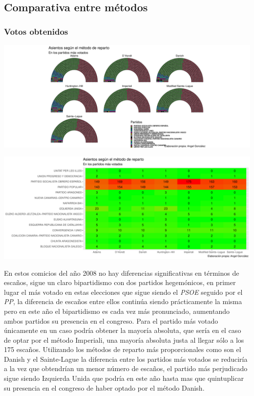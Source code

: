 \documentclass[12pt,a4paper,]{book}
\numberwithin{dummy}{section}
\theoremstyle{ocrenumbox}
\theoremstyle{blacknumex}
\theoremstyle{blacknumbox}
\theoremstyle{ocrenum}
\theoremstyle{ocrenum}
\begin{document}
\hypertarget{comparativa-entre-muxe9todos-9}{%
\subsection{Comparativa entre
métodos}\label{comparativa-entre-muxe9todos-9}}

\hypertarget{votos-obtenidos-9}{%
\subsubsection{Votos obtenidos}\label{votos-obtenidos-9}}

\begin{center}\includegraphics[width=0.95\linewidth]{figurasR/unnamed-chunk-92-1} \end{center}

\begin{center}\includegraphics[width=0.95\linewidth]{figurasR/unnamed-chunk-92-2} \end{center}

En estos comicios del año 2008 no hay diferencias significativas en
términos de escaños, sigue un claro bipartidismo con dos partidos
hegemónicos, en primer lugar el más votado en estas elecciones que sigue
siendo el \emph{PSOE} seguido por el \emph{PP}, la diferencia de escaños
entre ellos continúa siendo prácticamente la misma pero en este año el
bipartidismo es cada vez más pronunciado, aumentando ambos partidos su
presencia en el congreso. Para el partido más votado únicamente en un
caso podría obtener la mayoría absoluta, que sería en el caso de optar
por el método Imperiali, una mayoría absoluta justa al llegar sólo a los
175 escaños. Utilizando los métodos de reparto más proporcionales como
son el Danish y el Sainte-Lague la diferencia entre los partidos más
votados se reduciría a la vez que obtendrían un menor número de escaños,
el partido más perjudicado sigue siendo Izquierda Unida que podría en
este año hasta mas que quintuplicar su presencia en el congreso de haber
optado por el método Danish.
\end{document}
